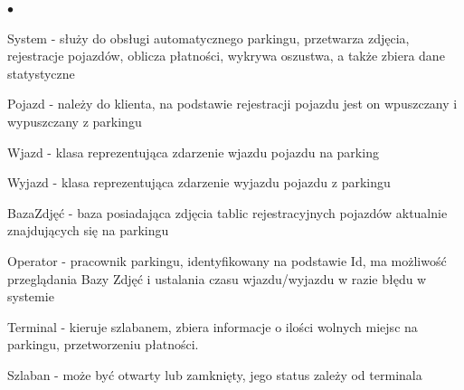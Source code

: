 \begin{list}{$\bullet$}{}
\item System - służy do obsługi automatycznego parkingu, przetwarza zdjęcia, rejestracje pojazdów, oblicza płatności, wykrywa oszustwa, a także zbiera dane statystyczne
\item Pojazd - należy do klienta, na podstawie rejestracji pojazdu jest on wpuszczany i wypuszczany z parkingu
\item Wjazd - klasa reprezentująca zdarzenie wjazdu pojazdu na parking
\item Wyjazd - klasa reprezentująca zdarzenie wyjazdu pojazdu z parkingu
\item BazaZdjęć - baza posiadająca zdjęcia tablic rejestracyjnych pojazdów aktualnie znajdujących się na parkingu
\item Operator - pracownik parkingu, identyfikowany na podstawie Id, ma możliwość przeglądania Bazy Zdjęć i ustalania czasu wjazdu/wyjazdu w razie błędu w systemie
\item Terminal - kieruje szlabanem, zbiera informacje o ilości wolnych miejsc na parkingu, przetworzeniu płatności.
\item Szlaban - może być otwarty lub zamknięty, jego status zależy od terminala
\end{list}
